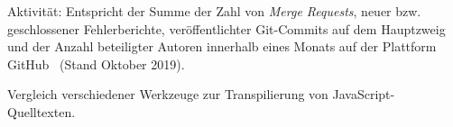 \begin{table}[tb]
{    \medbreak
    \begin{justify}
      Aktivität: Entspricht der Summe der Zahl von \emph{Merge Requests}, neuer bzw. geschlossener Fehlerberichte, veröffentlichter Git-Commits auf dem Hauptzweig und der Anzahl beteiligter Autoren innerhalb eines Monats auf der Plattform GitHub~\autocite{GITHUB} (Stand Oktober 2019).
    \end{justify}
  }
  \caption{Vergleich verschiedener Werkzeuge zur Transpilierung von JavaScript-Quelltexten.}
  \label{tab:transpilers}
\end{table}

